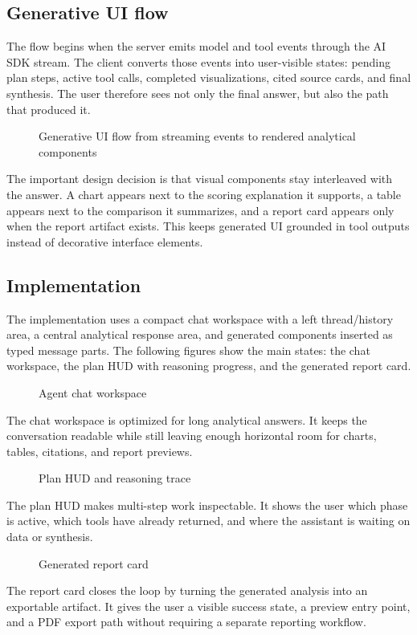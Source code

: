 \subsection{Generative UI flow}
The flow begins when the server emits model and tool events through the AI SDK stream. The client converts those events into user-visible states: pending plan steps, active tool calls, completed visualizations, cited source cards, and final synthesis. The user therefore sees not only the final answer, but also the path that produced it.
\begin{figure}[H]
  \centering
  \caption{Generative UI flow from streaming events to rendered analytical components}
\end{figure}
The important design decision is that visual components stay interleaved with the answer. A chart appears next to the scoring explanation it supports, a table appears next to the comparison it summarizes, and a report card appears only when the report artifact exists. This keeps generated UI grounded in tool outputs instead of decorative interface elements.

\subsection{Implementation}
The implementation uses a compact chat workspace with a left thread/history area, a central analytical response area, and generated components inserted as typed message parts. The following figures show the main states: the chat workspace, the plan HUD with reasoning progress, and the generated report card.
\begin{figure}[H]
  \centering
  \caption{Agent chat workspace}
\end{figure}
The chat workspace is optimized for long analytical answers. It keeps the conversation readable while still leaving enough horizontal room for charts, tables, citations, and report previews.
\begin{figure}[H]
  \centering
  \caption{Plan HUD and reasoning trace}
\end{figure}
The plan HUD makes multi-step work inspectable. It shows the user which phase is active, which tools have already returned, and where the assistant is waiting on data or synthesis.
\begin{figure}[H]
  \centering
  \caption{Generated report card}
\end{figure}
The report card closes the loop by turning the generated analysis into an exportable artifact. It gives the user a visible success state, a preview entry point, and a PDF export path without requiring a separate reporting workflow.
